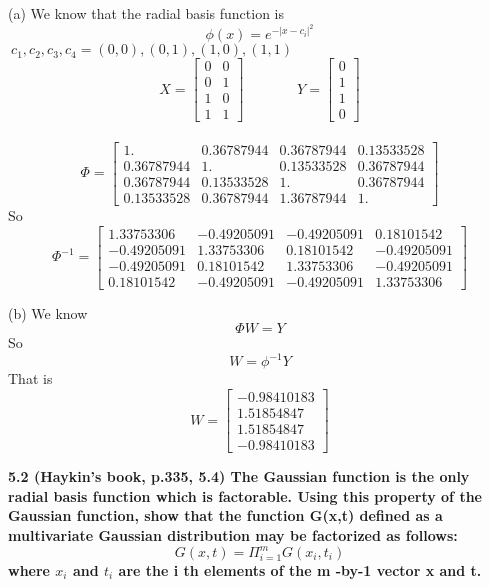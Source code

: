 \noindent(a) We know that the radial basis function is$$\phi(x) = e^{-|x-c_i|^2}$$
$~c_1,c_2,c_3,c_4 = (0,0),(0,1),(1,0),(1,1)~$ \\
$$X = \begin{bmatrix}
      0 & 0 \\
      0 & 1 \\
      1 & 0 \\
      1 & 1
    \end{bmatrix}~~~~~~~~~~~~~~~~~
Y = \begin{bmatrix}
      0 \\
      1 \\
      1 \\
      0
    \end{bmatrix}$$\\
$$\Phi = \begin{bmatrix}
              1.          &0.36787944  &0.36787944  &0.13533528 \\
              0.36787944  &1.          &0.13533528  &0.36787944 \\
              0.36787944  &0.13533528  &1.          &0.36787944 \\
              0.13533528  &0.36787944  &1.36787944  &1.
            \end{bmatrix}$$
So $$\Phi^{-1} = \begin{bmatrix}
              1.33753306 &-0.49205091 &-0.49205091  &0.18101542 \\
              -0.49205091 & 1.33753306  &0.18101542 &-0.49205091 \\
              -0.49205091  &0.18101542 & 1.33753306 &-0.49205091 \\
              0.18101542 &-0.49205091 &-0.49205091  &1.33753306
            \end{bmatrix}$$

\noindent(b)  We know $$~\Phi W = Y ~$$ So $$W =\phi^{-1} Y$$
That is $$W = \begin{bmatrix}
           -0.98410183 \\
           1.51854847 \\
           1.51854847 \\
           -0.98410183
         \end{bmatrix}$$

\noindent \textbf{5.2 (Haykin’s book, p.335, 5.4) The Gaussian function is the only radial basis function which is
factorable. Using this property of the Gaussian function, show that the function G(x,t) defined
as a multivariate Gaussian distribution may be factorized as follows:
$$G(x,t) = \Pi_{i=1}^{m}G(x_i,t_i)$$
where $x_i$ and $t_i$ are the i th elements of the m -by-1 vector x and t.}


